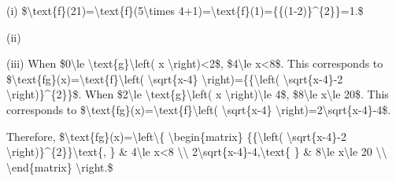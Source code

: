 \item {}

(i) \$\textbackslash text\{f\}(21)=\textbackslash text\{f\}(5\textbackslash times
4+1)=\textbackslash text\{f\}(1)=\{\{(1-2)\}\textasciicircum\{2\}\}=1.\$ 

(ii) 

(iii) When \$0\textbackslash le \textbackslash text\{g\}\textbackslash left(
x \textbackslash right)<2\$, \$4\textbackslash le x<8\$. This corresponds
to \$\textbackslash text\{fg\}(x)=\textbackslash text\{f\}\textbackslash left(
\textbackslash sqrt\{x-4\} \textbackslash right)=\{\{\textbackslash left(
\textbackslash sqrt\{x-4\}-2 \textbackslash right)\}\textasciicircum\{2\}\}\$.
When \$2\textbackslash le \textbackslash text\{g\}\textbackslash left(
x \textbackslash right)\textbackslash le 4\$, \$8\textbackslash le
x\textbackslash le 20\$. This corresponds to \$\textbackslash text\{fg\}(x)=\textbackslash text\{f\}\textbackslash left(
\textbackslash sqrt\{x-4\} \textbackslash right)=2\textbackslash sqrt\{x-4\}-4\$.

Therefore, \$\textbackslash text\{fg\}(x)=\textbackslash left\textbackslash\{
\textbackslash begin\{matrix\} \{\{\textbackslash left( \textbackslash sqrt\{x-4\}-2
\textbackslash right)\}\textasciicircum\{2\}\}\textbackslash text\{,
\} \& 4\textbackslash le x<8 \textbackslash\textbackslash{} 2\textbackslash sqrt\{x-4\}-4,\textbackslash text\{
\} \& 8\textbackslash le x\textbackslash le 20 \textbackslash\textbackslash{}
\textbackslash end\{matrix\} \textbackslash right.\$